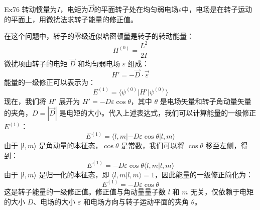 \begin{question}{Ex76}
    转动惯量为$I$，电矩为$\vec{D}$的平面转子处在均匀弱电场$\varepsilon$中，电场是在转子运动的平面上，用微扰法求转子能量的修正值。
\end{question}
\begin{solution}
    在这个问题中，转子的零级近似哈密顿量是转子的转动能量：
    $$
        H^{(0)} = \frac{L^2}{2I}
    $$
    微扰项由转子的电矩 $\vec{D}$ 和均匀弱电场 $\varepsilon$ 组成：
    $$
        H' = -\vec{D} \cdot \vec{\varepsilon}
    $$
    能量的一级修正可以表示为：
    $$
        E^{(1)} = \langle \psi^{(0)} | H' | \psi^{(0)} \rangle
    $$
    现在，我们将 $H'$ 展开为 $H' = -D \varepsilon \cos \theta$，其中 $\theta$ 是电场矢量和转子角动量矢量的夹角，$D = |\vec{D}|$ 是电矩的大小。代入上述表达式，我们可以计算能量的一级修正 $E^{(1)}$：
    $$
        E^{(1)} = \langle l, m | -D \varepsilon \cos \theta | l, m \rangle
    $$
    由于 $|l, m\rangle$ 是角动量的本征态，$\cos\theta$ 是常数，我们可以将 $\cos\theta$ 移至左侧，得到：
    $$
        E^{(1)} = -D \varepsilon \cos \theta \langle l, m | l, m \rangle
    $$
    由于 $|l, m\rangle$ 是归一化的本征态，即 $\langle l, m | l, m \rangle = 1$，因此能量的一级修正简化为：
    $$
        E^{(1)} = -D \varepsilon \cos \theta
    $$
    这是转子能量的一级修正值。修正值与角动量量子数 $l$ 和 $m$ 无关，仅依赖于电矩的大小 $D$、电场的大小 $\varepsilon$ 和电场方向与转子运动平面的夹角 $\theta$。
\end{solution}
